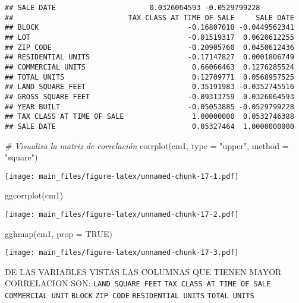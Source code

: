 \documentclass[
]{article}
\newenvironment{Shaded}{\begin{snugshade}}{\end{snugshade}}
\newcommand{\AttributeTok}[1]{\textcolor[rgb]{0.77,0.63,0.00}{#1}}
\newcommand{\CommentTok}[1]{\textcolor[rgb]{0.56,0.35,0.01}{\textit{#1}}}
\newcommand{\ConstantTok}[1]{\textcolor[rgb]{0.00,0.00,0.00}{#1}}
\newcommand{\FunctionTok}[1]{\textcolor[rgb]{0.00,0.00,0.00}{#1}}
\newcommand{\NormalTok}[1]{#1}
\newcommand{\StringTok}[1]{\textcolor[rgb]{0.31,0.60,0.02}{#1}}
\begin{document}
\begin{verbatim}
## SALE DATE                      0.0326064593 -0.0529799228
##                           TAX CLASS AT TIME OF SALE     SALE DATE
## BLOCK                                   -0.16807018 -0.0449562341
## LOT                                     -0.01519317  0.0620612255
## ZIP CODE                                -0.20905760  0.0450612436
## RESIDENTIAL UNITS                       -0.17147827  0.0001806749
## COMMERCIAL UNITS                         0.66066463  0.1276285524
## TOTAL UNITS                              0.12709771  0.0568957525
## LAND SQUARE FEET                         0.35191983 -0.0352745516
## GROSS SQUARE FEET                       -0.09313759  0.0326064593
## YEAR BUILT                              -0.05053885 -0.0529799228
## TAX CLASS AT TIME OF SALE                1.00000000  0.0532746388
## SALE DATE                                0.05327464  1.0000000000
\end{verbatim}

\begin{Shaded}
\begin{Highlighting}[]
\CommentTok{\# Visualiza la matriz de correlación}
\FunctionTok{corrplot}\NormalTok{(cm1, }\AttributeTok{type =} \StringTok{"upper"}\NormalTok{, }\AttributeTok{method =} \StringTok{"square"}\NormalTok{)}
\end{Highlighting}
\end{Shaded}

\texttt{[image: main\_files/figure-latex/unnamed-chunk-17-1.pdf]}

\begin{Shaded}
\begin{Highlighting}[]
\FunctionTok{ggcorrplot}\NormalTok{(cm1)}
\end{Highlighting}
\end{Shaded}

\texttt{[image: main\_files/figure-latex/unnamed-chunk-17-2.pdf]}

\begin{Shaded}
\begin{Highlighting}[]
\FunctionTok{gghmap}\NormalTok{(cm1, }\AttributeTok{prop =} \ConstantTok{TRUE}\NormalTok{)}
\end{Highlighting}
\end{Shaded}

\texttt{[image: main\_files/figure-latex/unnamed-chunk-17-3.pdf]}

DE LAS VARIABLES VISTAS LAS COLUMNAS QUE TIENEN MAYOR CORRELACION SON:
\texttt{LAND\ SQUARE\ FEET} \texttt{TAX\ CLASS\ AT\ TIME\ OF\ SALE}
\texttt{COMMERCIAL\ UNIT} \texttt{BLOCK} \texttt{ZIP\ CODE}
\texttt{RESIDENTIAL\ UNITS} \texttt{TOTAL\ UNITS}
\end{document}
